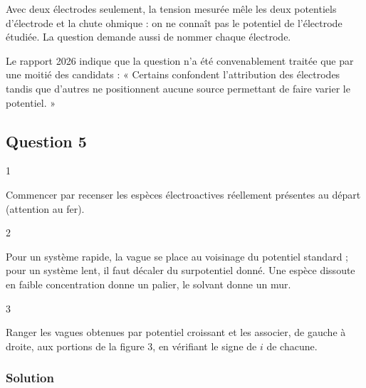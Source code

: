 \documentclass[11pt,a4paper]{article}
\begin{document}
\begin{piege}

Avec deux électrodes seulement, la tension mesurée mêle les deux potentiels d'électrode et la chute ohmique : on ne connaît pas le potentiel de l'électrode étudiée. La question demande aussi de nommer chaque électrode.

\end{piege}

\begin{jury}

Le rapport 2026 indique que la question n'a été convenablement traitée que par une moitié des candidats : « Certains confondent l'attribution des électrodes tandis que d'autres ne positionnent aucune source permettant de faire varier le potentiel. »

\end{jury}

\hypertarget{question-5}{%
\subsection{Question 5}\label{question-5}}

\begin{indication}{1}

Commencer par recenser les espèces électroactives réellement présentes au départ (attention au fer).

\end{indication}

\begin{indication}{2}

Pour un système rapide, la vague se place au voisinage du potentiel standard ; pour un système lent, il faut décaler du surpotentiel donné. Une espèce dissoute en faible concentration donne un palier, le solvant donne un mur.

\end{indication}

\begin{indication}{3}

Ranger les vagues obtenues par potentiel croissant et les associer, de gauche à droite, aux portions de la figure 3, en vérifiant le signe de \(i\) de chacune.

\end{indication}

\hypertarget{solution-4}{%
\subsubsection{Solution}\label{solution-4}}
\end{document}
